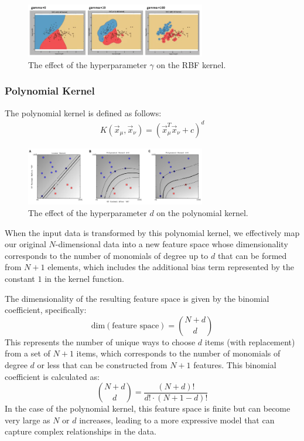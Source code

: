 \documentclass[11pt]{book} %
\begin{document}
\begin{figure}[h]
    \centering
    \includegraphics[width=0.7\textwidth]{./Figs/RBF_gamma.png}
    \caption{The effect of the hyperparameter \( \gamma \) on the RBF kernel.}
    \label{fig:RBF_kernel}
\end{figure}


\subsubsection{Polynomial Kernel}
The polynomial kernel is defined as follows:
\begin{align*}
    K(\vec{x}_\mu, \vec{x}_\nu) = (\vec{x}_\mu^T \vec{x}_\nu + c)^d
\end{align*}

\begin{figure}[h]
    \centering
    \includegraphics[width=0.7\textwidth]{./Figs/Poly_deg.png}
    \caption{The effect of the hyperparameter \( d \) on the polynomial kernel.}
    \label{fig:RBF_kernel}
\end{figure}

When the input data is transformed by this polynomial kernel, we effectively map our original \( N \)-dimensional data into a new feature space whose dimensionality corresponds to the number of monomials of degree up to \( d \) that can be formed from \( N + 1 \) elements, which includes the additional bias term represented by the constant \( 1 \) in the kernel function.

The dimensionality of the resulting feature space is given by the binomial coefficient, specifically:
\begin{equation}
    \text{dim}(\text{feature space}) = \binom{N + d}{d}
\end{equation}
This represents the number of unique ways to choose \( d \) items (with replacement) from a set of \( N + 1 \) items, which corresponds to the number of monomials of degree \( d \) or less that can be constructed from \( N + 1 \) features. This binomial coefficient is calculated as:
\begin{equation}
    \binom{N + d}{d} = \frac{(N + d)!}{d! \cdot (N + 1 - d)!}
\end{equation}
In the case of the polynomial kernel, this feature space is finite but can become very large as \( N \) or \( d \) increases, leading to a more expressive model that can capture complex relationships in the data.
\end{document}
